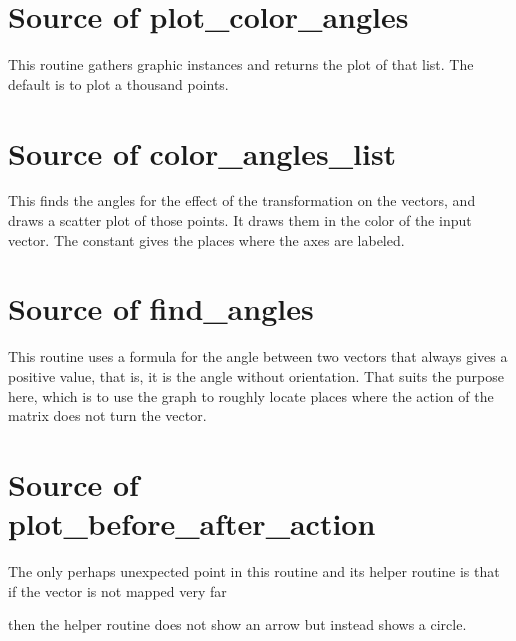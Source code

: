


\section{Source of plot\_color\_angles}
This routine gathers graphic instances and returns the plot of that list.
The default is to plot a thousand points.


\section{Source of color\_angles\_list}
This finds the angles for the effect of the transformation on the vectors,
and draws a scatter plot of those points.
It draws them in the color of the input vector.
The  constant gives the places where the 
axes are labeled.


\section{Source of find\_angles}
This routine uses a formula for the angle between two vectors that 
always gives a positive value, that is, it is the angle without orientation.
That suits the purpose here, which is to use the graph to 
roughly locate places where the action of the matrix does not turn the
vector. 



\section{Source of plot\_before\_after\_action}
The only perhaps unexpected point in this routine and its helper routine
is that if the vector is not mapped very far 

then the helper
routine does not show an arrow but instead shows a circle.

\endinput

TODO

